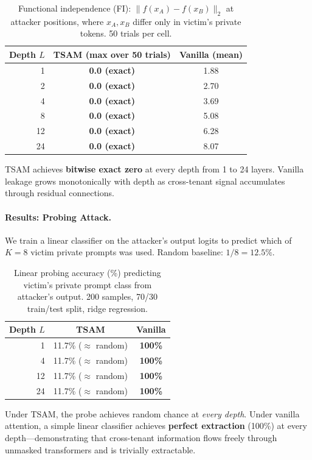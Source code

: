 \begin{table}[h]
\centering
\caption{Functional independence (FI): $\|f(x_A) - f(x_B)\|_2$ at attacker positions,
where $x_A, x_B$ differ only in victim's private tokens.  50 trials per cell.}
\label{tab:fi}
\begin{tabular}{rcc}
\toprule
Depth $L$ & TSAM (max over 50 trials) & Vanilla (mean) \\
\midrule
1  & \textbf{0.0 (exact)} & 1.88 \\
2  & \textbf{0.0 (exact)} & 2.70 \\
4  & \textbf{0.0 (exact)} & 3.69 \\
8  & \textbf{0.0 (exact)} & 5.08 \\
12 & \textbf{0.0 (exact)} & 6.28 \\
24 & \textbf{0.0 (exact)} & 8.07 \\
\bottomrule
\end{tabular}
\end{table}

TSAM achieves \textbf{bitwise exact zero} at every depth from 1 to 24 layers.
Vanilla leakage grows monotonically with depth as cross-tenant signal accumulates
through residual connections.

\paragraph{Results: Probing Attack.}
We train a linear classifier on the attacker's output logits to predict which
of $K = 8$ victim private prompts was used.  Random baseline: $1/8 = 12.5\%$.

\begin{table}[h]
\centering
\caption{Linear probing accuracy (\%) predicting victim's private prompt class
from attacker's output.  200 samples, 70/30 train/test split, ridge regression.}
\label{tab:probe}
\begin{tabular}{rcc}
\toprule
Depth $L$ & TSAM & Vanilla \\
\midrule
1  & 11.7\% ($\approx$ random) & \textbf{100\%} \\
4  & 11.7\% ($\approx$ random) & \textbf{100\%} \\
12 & 11.7\% ($\approx$ random) & \textbf{100\%} \\
24 & 11.7\% ($\approx$ random) & \textbf{100\%} \\
\bottomrule
\end{tabular}
\end{table}

Under TSAM, the probe achieves random chance at \emph{every depth}.
Under vanilla attention, a simple linear classifier achieves \textbf{perfect
extraction} (100\%) at every depth---demonstrating that cross-tenant information
flows freely through unmasked transformers and is trivially extractable.

